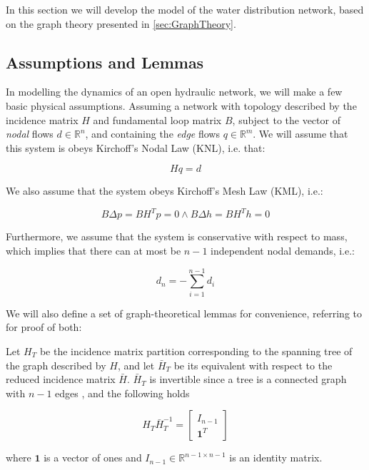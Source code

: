 In this section we will develop the model of the water distribution network, based on the graph theory presented in \cref{sec:GraphTheory}.

\subsection{Assumptions and Lemmas}\label{subsec:AsssumAndLemmas}

In modelling the dynamics of an open hydraulic network, we will make a few basic physical assumptions. Assuming a network with topology described by the incidence matrix $H$ and fundamental loop matrix $B$, subject to the vector of \textit{nodal} flows $d \in \mathbb{R}^n$, and containing the \textit{edge} flows $q \in \mathbb{R}^m$. We will assume that this system is obeys Kirchoff's Nodal Law (KNL), i.e. that:

\begin{equation}\label{eq:KirchNodeLaw}
	Hq = d
\end{equation} 

We also assume that the system obeys Kirchoff's Mesh Law (KML), i.e.:

\begin{equation}\label{eq:KirchMeshLaw}
	B\Delta p = B H^T p = 0 \wedge B\Delta h = B H^T h = 0
\end{equation}

Furthermore, we assume that the system is conservative with respect to mass, which implies that there can at most be $n-1$ independent nodal demands, i.e.:

\begin{equation}\label{eq:MassConservation}
	d_n = -\sum_{i=1}^{n-1}d_i
\end{equation}

We will also define a set of graph-theoretical lemmas for convenience, referring to \cite{Jensen} for proof of both:

\begin{lemma}\label{lem:TreePartitionLemma}
	Let $H_T$ be the incidence matrix partition corresponding to the spanning tree of the graph described by $H$, and let $\bar{H}_T$ be its equivalent with respect to the reduced incidence matrix $\bar{H}$. $\bar{H}_T$ is invertible since a tree is a connected graph with $n-1$ edges \cite{Deo}, and the following holds
	
	\begin{equation}\label{eq:TreePartitionLemma}
		H_T\bar{H}_T^{-1} = \begin{bmatrix} I_{n-1} \\ \mathbf{1}^T	\end{bmatrix}
	\end{equation}

where $\mathbf{1}$ is a vector of ones and $I_{n-1} \in \mathbb{R}^{n-1 \times n-1}$ is an identity matrix.
\end{lemma}

